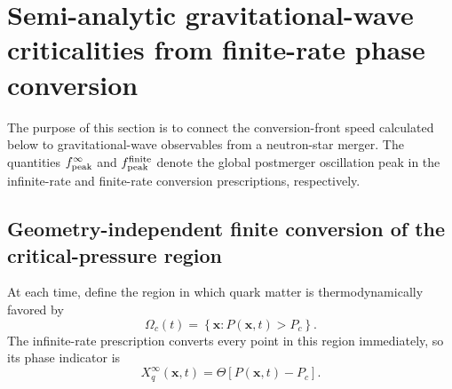 \documentclass[11pt]{article}
\begin{document}
\section{Semi-analytic gravitational-wave criticalities from finite-rate phase conversion}
\label{sec:gw-criticalities}

The purpose of this section is to connect the conversion-front speed calculated below to gravitational-wave observables from a neutron-star merger.
The quantities \(f_{\rm peak}^{\infty}\) and \(f_{\rm peak}^{\rm finite}\) denote the global postmerger oscillation peak in the infinite-rate and finite-rate conversion prescriptions, respectively.

\subsection{Geometry-independent finite conversion of the critical-pressure region}
\label{sec:gw-generic-conversion}

At each time, define the region in which quark matter is thermodynamically favored by
\begin{equation}
\Omega_c(t)
=
\left\{
\boldsymbol{x}:P(\boldsymbol{x},t)>P_c
\right\}.
\label{eq:critical-pressure-region}
\end{equation}
The infinite-rate prescription converts every point in this region immediately, so its phase indicator is
\begin{equation}
X_q^{\infty}(\boldsymbol{x},t)
=
\Theta\!\left[P(\boldsymbol{x},t)-P_c\right].
\label{eq:infinite-phase-indicator}
\end{equation}
\end{document}

